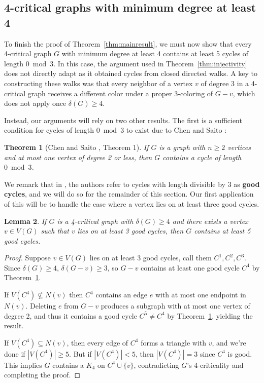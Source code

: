 \documentclass[12pt]{article}
\newtheorem{theorem}{Theorem}
\numberwithin{theorem}{section}
\newtheorem{lem}[theorem]{Lemma}
\begin{document}
\subsection{4-critical graphs with minimum degree at least 4}
\label{sec:MinDeg4}

To finish the proof of Theorem~\ref{thm:mainresult}, we must now show that every 4-critical graph $G$ with minimum degree at least 4 contains at least 5 cycles of length $0\bmod 3$. In this case, the argument used in Theorem~\ref{thm:injectivity} does not directly adapt as it obtained cycles from closed directed walks. A key to constructing these walks was that every neighbor of a vertex $v$ of degree 3 in a 4-critical graph receives a different color under a proper 3-coloring of $G-v$, which does not apply once $\delta(G) \ge 4$.


Instead, our arguments will rely on two other results.  The first is a sufficient condition for cycles of length $0 \bmod 3$ to exist due to Chen and Saito \cite{ChenSaito}:

\begin{theorem}[Chen and Saito \cite{ChenSaito}, Theorem 1]
    \label{thm:ChenSaito}
    If $G$ is a graph with $n \ge 2$ vertices and at most one vertex of degree 2 or less, then $G$ contains a cycle of length $0 \bmod 3$.
\end{theorem}

We remark that in \cite{ChenSaito}, the authors refer to cycles with length divisible by $3$ as {\bf good cycles}, and we will do so for the remainder of this section. Our first application of this will be to handle the case where a vertex lies on at least three good cycles.

\begin{lem}
\label{lem:4gooda}
    If $G$ is a 4-critical graph with $\delta(G)\ge 4$ and there exists a vertex $v \in V(G)$ such that $v$ lies on at least 3 good cycles, then $G$ contains at least 5 good cycles.
\end{lem}

\begin{proof}
    Suppose $v \in V(G)$ lies on at least 3 good cycles, call them $C^1,C^2,C^3$.  Since $\delta(G) \ge 4$, $\delta(G-v) \ge 3$, so $G-v$ contains at least one good cycle $C^4$ by Theorem~\ref{thm:ChenSaito}.

   If $V(C^4) \nsubseteq N(v)$ then $C^4$ contains an edge $e$ with at most one endpoint in $N(v)$. Deleting $e$ from $G-v$ produces a subgraph with at most one vertex of degree 2, and thus it contains a good cycle $C^5\ne C^4$ by Theorem~\ref{thm:ChenSaito}, yielding the result.

   If $V(C^4) \subseteq N(v)$, then every edge of $C^4$ forms a triangle with $v$, and we're done if $|V(C^4)|\ge 5$.  But if $|V(C^4)|<5$, then $|V(C^4)|=3$ since $C^4$ is good. This implies $G$ contains a $K_4$ on $C^4 \cup \{v\}$, contradicting $G$'s 4-criticality and completing the proof.

\end{proof}
\end{document}
